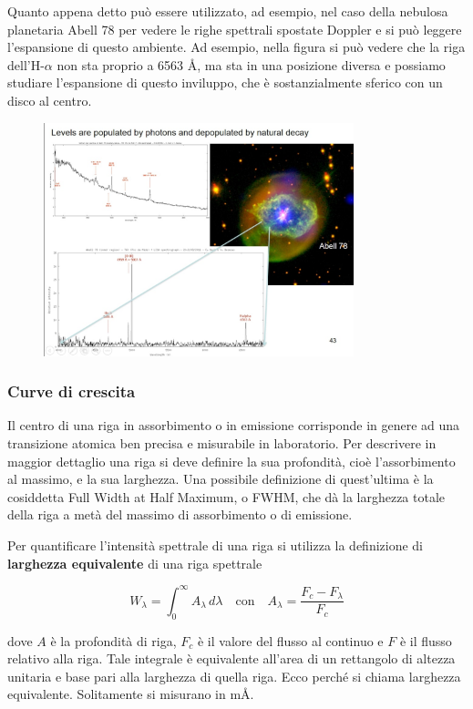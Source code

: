 \vspace{0.2cm}Quanto appena detto può essere utilizzato, ad esempio, nel caso della nebulosa planetaria Abell 78 per vedere le righe spettrali spostate Doppler e si può leggere l'espansione di questo ambiente. Ad esempio, nella figura si può vedere che la riga dell'H-$\alpha$ non sta proprio a 6563 \AA, ma sta in una posizione diversa e possiamo studiare l'espansione di questo inviluppo, che è sostanzialmente sferico con un disco al centro.

\begin{figure}[H]
  \centering
  \includegraphics[width=9cm]{abell.jpg}
  \label{fig:Abell}
\end{figure}

\subsubsection{Curve di crescita}

Il centro di una riga in assorbimento o in emissione corrisponde in genere ad una transizione atomica ben precisa e misurabile in laboratorio. Per descrivere in maggior dettaglio una riga si deve definire la sua profondità, cioè l'assorbimento al massimo, e la sua larghezza. Una possibile definizione di quest'ultima è la cosiddetta Full Width at Half Maximum, o FWHM, che dà la larghezza totale della riga a metà del massimo di assorbimento o di emissione.

Per quantificare l'intensità spettrale di una riga si utilizza la definizione di \textbf{larghezza equivalente} di una riga spettrale

$$W_{\lambda}=\int_{0}^{\infty} A_{\lambda} \, d{\lambda}
\quad \text{con} \quad
A_{\lambda}=\frac{F_c - F_{\lambda}}{F_c}$$

dove $A$ è la profondità di riga, $F_c$ è il valore del flusso al continuo e $F$ è il flusso relativo alla riga. Tale integrale è equivalente all'area di un rettangolo di altezza unitaria e base pari alla larghezza di quella riga. Ecco perché si chiama larghezza equivalente. Solitamente si misurano in m\AA.


